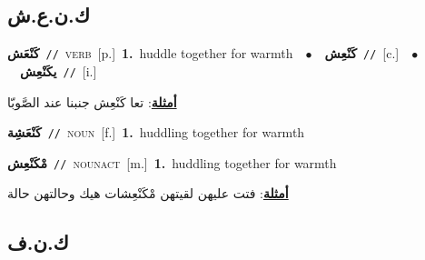 \documentclass[10pt,a4paper,twoside]{article} %
\begin{document}
\begin{multicols}{2}
\vspace{-3mm}
\subsection*{\color{blue}\foreignlanguage{arabic}{ك.ن.ع.ش}\color{blue}{}} 

{\setlength\topsep{0pt}\textbf{\foreignlanguage{arabic}{كَنْعَش}}\ {\color{gray}\texttt{//}\color{black}}\ \textsc{verb}\ [p.]\ \textbf{1.}~huddle together for warmth\ \ $\bullet$\ \ \setlength\topsep{0pt}\textbf{\foreignlanguage{arabic}{كَنْعِش}}\ {\color{gray}\texttt{//}\color{black}}\ [c.]\ \ $\bullet$\ \ \setlength\topsep{0pt}\textbf{\foreignlanguage{arabic}{يكَنْعِش}}\ {\color{gray}\texttt{//}\color{black}}\ [i.]\  \begin{flushright}\color{gray}\foreignlanguage{arabic}{\textbf{\underline{\foreignlanguage{arabic}{أمثلة}}}: تعا كَنْعِش جنبنا عند الصَّوبّا}\end{flushright}\color{black}} \vspace{2mm}

{\setlength\topsep{0pt}\textbf{\foreignlanguage{arabic}{كَنْعَشِة}}\ {\color{gray}\texttt{//}\color{black}}\ \textsc{noun}\ [f.]\ \textbf{1.}~huddling together for warmth\ } \vspace{2mm}

{\setlength\topsep{0pt}\textbf{\foreignlanguage{arabic}{مْكَنْعِش}}\ {\color{gray}\texttt{//}\color{black}}\ \textsc{noun\textunderscore act}\ [m.]\ \textbf{1.}~huddling together for warmth\  \begin{flushright}\color{gray}\foreignlanguage{arabic}{\textbf{\underline{\foreignlanguage{arabic}{أمثلة}}}: فتت عليهن لقيتهن مْكَنْعِشات هيك وحالتهن حالة}\end{flushright}\color{black}} \vspace{2mm}

\vspace{-3mm}
\subsection*{\color{blue}\foreignlanguage{arabic}{ك.ن.ف}\color{blue}{}} 


\end{multicols}
\end{document}
